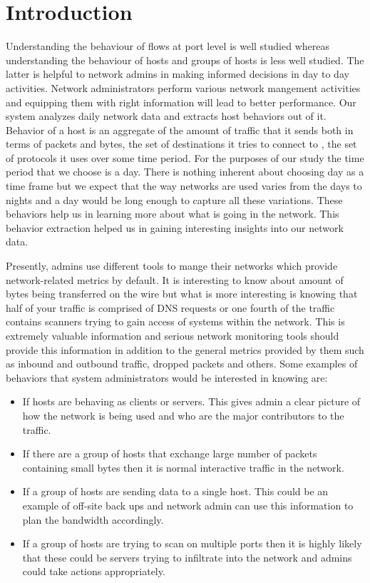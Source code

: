 
\chapter{Introduction}

Understanding the behaviour of flows at port level is well studied whereas understanding the
behaviour of hosts and groups of hosts is less well studied. The latter is helpful to network admins in making
informed decisions in day to day activities. Network administrators perform various network mangement activities and equipping them with right information will lead to better performance. 
Our system analyzes daily network data and extracts host behaviors out of it.  Behavior of a host is an aggregate of the amount of traffic that it sends both in terms of packets and bytes, the set of destinations it tries to connect to , the set of protocols it uses over some time period. For the purposes of our study the time period that we choose is a day. There is nothing inherent about choosing day as a time frame but we expect that the way networks are used varies from the days to nights and a day would be long enough to capture all these variations. These behaviors help us in learning more about what is going in the network. 
This behavior extraction helped us in gaining interesting insights into our network data.


Presently, admins use different tools to mange their networks which provide network-related metrics by default. It is interesting to know about amount of bytes being transferred on the wire but what is more interesting is knowing that half of your traffic is comprised of DNS requests or one fourth of the traffic contains scanners trying to gain access of systems within the network. This is extremely valuable information and serious network monitoring tools should provide this information in addition to the general metrics provided by them such as inbound and outbound traffic, dropped packets and others. Some examples of behaviors that system administrators would be interested in knowing are:
\begin{itemize}
	\item If hosts are behaving as clients or servers. This gives admin a clear picture of how the network is being used and who are the major contributors to the traffic.
	\item If there are a group of hosts that exchange large number of packets containing small bytes then it is normal interactive traffic in the network.	
	\item If a group of hosts are sending data to a single host. This could be an example of off-site back ups and network admin can use this information to plan the bandwidth accordingly.
	\item If a group of hosts are trying to scan on multiple ports then it is highly likely that these could be servers trying to infiltrate into the network and admins could take actions appropriately.
	
\end{itemize}

